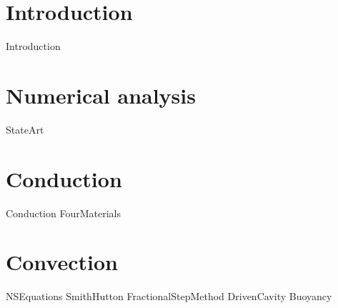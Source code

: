 
\setlength{\parindent}{0pt}

\usepackage{epigraph}
\usepackage{tocloft}
\usepackage{mathcomp}

\usepackage{multicol}
\usepackage[T1]{fontenc}
\usepackage{titlesec, blindtext, color}
\newcommand{\hsp}{\hspace{20pt}}
\titleformat{\chapter}[hang]{\Huge\bfseries}{\thechapter\hsp\textcolor{gray75}{|}\hsp}{0pt}{\Huge\bfseries}


\renewcommand{\familydefault}{\sfdefault}





\setcounter{tocdepth}{3}
\tableofcontents
\pagebreak

\renewcommand{\cfttabnumwidth}{4em}
\listoftables
\pagebreak

\renewcommand{\cftfignumwidth}{4em}
\listoffigures



\newpage
{}

\newpage
\setlength{\parskip}{1em}

\part{Introduction}
{Introduction}

\part{Numerical analysis}
{StateArt}

\part{Conduction}
{Conduction}
{FourMaterials}

\part{Convection}
{NSEquations}
{SmithHutton}
{FractionalStepMethod}
{DrivenCavity}
{Buoyancy}


